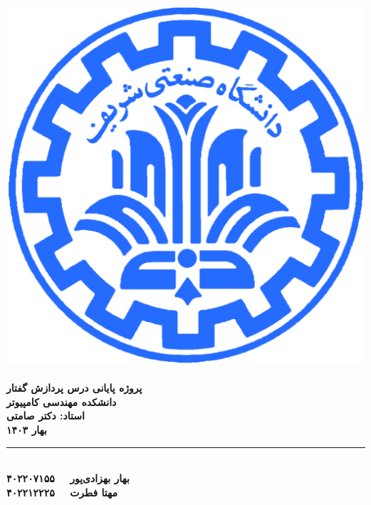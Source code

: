 \documentclass[fleqn]{report}
\begin{document}
\begin{titlepage}
    \begin{center}
        \includegraphics{sharif.png}\\
        \vspace{1cm}    \textbf{\LARGE   {}}\\
        \vspace{1cm}  \textbf{\Large  پروژه پایانی درس پردازش گفتار}\\
        \vspace{1cm}    \textbf{\large  دانشکده مهندسی کامپیوتر}\\
        \vspace{0.5cm}  \textbf{\large  استاد: دکتر صامتی}\\
        \vspace{0.5cm}  \textbf{\large  بهار ۱۴۰۳}\\
        \vspace{0.5cm}  \noindent\rule{8cm}{0.4pt}\\
        \vspace{2cm}    \textbf{\large بهار بهزادی‌پور \ \   ۴۰۲۲۰۷۱۵۵}\\
        \vspace{0.5cm}    \textbf{\large مهتا فطرت \ \   ۴۰۲۲۱۲۲۲۵}\\
    \end{center}
\end{titlepage}
\end{document}
